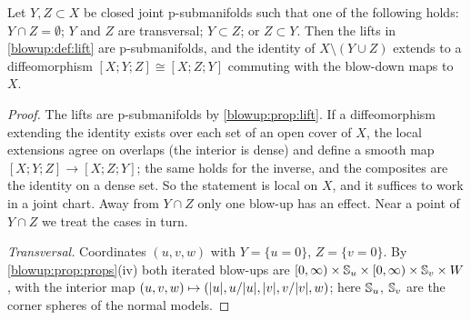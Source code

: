 \begin{proposition}\label{blowup:prop:commute}
Let $Y,Z\subset X$ be closed joint p-submanifolds such that one of the following holds:
$Y\cap Z=\emptyset$; $Y$ and $Z$ are transversal; $Y\subset Z$; or $Z\subset Y$. Then the
lifts in \cref{blowup:def:lift} are p-submanifolds, and the identity of $X\setminus(Y\cup Z)$
extends to a diffeomorphism $[X;Y;Z]\cong[X;Z;Y]$ commuting with the blow-down maps to
$X$.
\end{proposition}
\begin{proof}
The lifts are p-submanifolds by \cref{blowup:prop:lift}. If a diffeomorphism extending
the identity exists over each set of an open cover of $X$, the local extensions agree on
overlaps (the interior is dense) and define a smooth map $[X;Y;Z]\to[X;Z;Y]$; the same
holds for the inverse, and the composites are the identity on a dense set. So the
statement is local on $X$, and it suffices to work in a joint chart. Away from $Y\cap Z$
only one blow-up has an effect. Near a point of $Y\cap Z$ we treat the cases in turn.

\emph{Transversal.} Coordinates $(u,v,w)$ with $Y=\{u=0\}$, $Z=\{v=0\}$. By
\cref{blowup:prop:props}(iv) both iterated blow-ups are
$[0,\infty)\times\mathbb{S}_u\times[0,\infty)\times\mathbb{S}_v\times W$, with the interior
map $(u,v,w)\mapsto(\lvert u\rvert,u/\lvert u\rvert,\lvert v\rvert,v/\lvert v\rvert,w)$; here $\mathbb{S}_u$, $\mathbb{S}_v$ are
the corner spheres of the normal models.


\end{proof}
